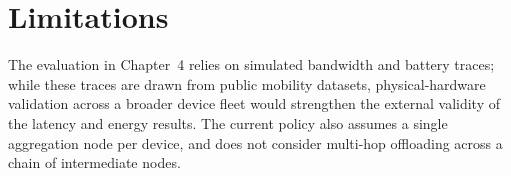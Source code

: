 \section{Limitations}

The evaluation in Chapter~4 relies on simulated bandwidth and battery traces; while these traces are drawn from public mobility datasets, physical-hardware validation across a broader device fleet would strengthen the external validity of the latency and energy results. The current policy also assumes a single aggregation node per device, and does not consider multi-hop offloading across a chain of intermediate nodes.

